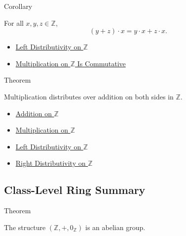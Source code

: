 \begin{corollarybox}{Corollary}
\begin{corollary}
\label{cor:right-distributivity-on-z}
For all $x,y,z\in\mathbb{Z}$,
\[
(y+z)\cdot x=y\cdot x+z\cdot x.
\]
\end{corollary}
\end{corollarybox}

\begin{dependencies}
\begin{itemize}
  \item \hyperref[thm:left-distributivity-on-z]{Left Distributivity on $\mathbb{Z}$}
  \item \hyperref[thm:multiplication-on-z-commutative]{Multiplication on $\mathbb{Z}$ Is Commutative}
\end{itemize}
\end{dependencies}

\begin{theorembox}{Theorem}
\begin{theorem}
\label{thm:multiplication-distributes-over-addition-on-z}
Multiplication distributes over addition on both sides in $\mathbb{Z}$.
\end{theorem}
\end{theorembox}

\begin{dependencies}
\begin{itemize}
  \item \hyperref[def:addition-on-z-classes]{Addition on $\mathbb{Z}$}
  \item \hyperref[def:multiplication-on-z-classes]{Multiplication on $\mathbb{Z}$}
  \item \hyperref[thm:left-distributivity-on-z]{Left Distributivity on $\mathbb{Z}$}
  \item \hyperref[cor:right-distributivity-on-z]{Right Distributivity on $\mathbb{Z}$}
\end{itemize}
\end{dependencies}

\subsection*{Class-Level Ring Summary}

\begin{theorembox}{Theorem}
\begin{theorem}
\label{thm:z-additive-abelian-group}
The structure $(\mathbb{Z},+,0_{\mathbb{Z}})$ is an abelian group.
\end{theorem}
\end{theorembox}

